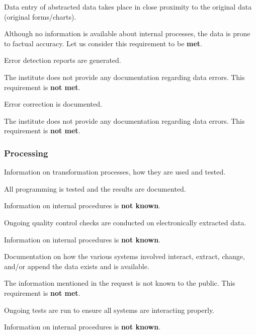 \begin{QandA}
    \item Data entry of abstracted data takes place in close proximity to the original data (original forms/charts).
    \begin{answered}
        Although no information is available about internal processes, the data is prone to factual accuracy.
        Let us consider this requirement to be \textbf{met}.
    \end{answered}

    \item Error detection reports are generated.
    \begin{answered}
        The institute does not provide any documentation regarding data errors.
        This requirement is \textbf{not met}.
    \end{answered}

    \item Error correction is documented.
    \begin{answered}
        The institute does not provide any documentation regarding data errors.
        This requirement is \textbf{not met}.
    \end{answered}

\end{QandA}

\subsubsection{Processing}

Information on transformation processes, how they are used and tested.

\begin{QandA}
    \item All programming is tested and the results are documented.
    \begin{answered}
        Information on internal procedures is \textbf{not known}.
    \end{answered}

    \item Ongoing quality control checks are conducted on electronically extracted data.
    \begin{answered}
        Information on internal procedures is \textbf{not known}.
    \end{answered}

    \item Documentation on how the various systems involved interact, extract, change, and/or append the data exists and is available.
    \begin{answered}
        The information mentioned in the request is not known to the public.
        This requirement is \textbf{not met}.
    \end{answered}

    \item Ongoing tests are run to ensure all systems are interacting properly.
    \begin{answered}
        Information on internal procedures is \textbf{not known}.
    \end{answered}

\end{QandA}

